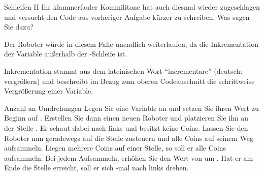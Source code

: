 \documentclass{../tuda-exercise}
\begin{document}
  \begin{task}[credit=\stars{1}{3}]{Schleifen II}
    Ihr klammerfauler Kommilitone hat auch diesmal wieder zugeschlagen und versucht den Code aus
    vorheriger Aufgabe kürzer zu schreiben. Was sagen Sie dazu?

    

    \begin{solution}
      Der Roboter würde in diesem Falle unendlich weiterlaufen, da die Inkrementation der
      Variable  außerhalb der -Schleife ist.

      \begin{note}[title=Information:]
        Inkrementation stammt aus dem lateinischen Wort \enquote{incrementare} (deutsch:
        vergrößern) und beschreibt im Bezug zum oberen Codeauschnitt die schrittweise
        Vergrößerung einer Variable.
      \end{note}
    \end{solution}
  \end{task}

  \begin{task}[credit=\stars{2}{3}]{Anzahl an Umdrehungen}
    Legen Sie eine Variable  an und setzen Sie ihren Wert zu Beginn
    auf . Erstellen Sie dann einen neuen Roboter und platzieren Sie ihn an der
    Stelle . Er schaut dabei nach links und besitzt keine Coins. Lassen Sie den
    Roboter nun geradewegs auf die Stelle  zusteuern und alle Coins auf seinem
    Weg aufsammeln. Liegen mehrere Coins auf einer Stelle, so soll er alle Coins aufsammeln. Bei
    jedem Aufsammeln, erhöhen Sie den Wert von  um . Hat
    er am Ende die Stelle  erreicht, soll er sich
    -mal nach links drehen.

    \begin{solution}
      
    \end{solution}
  \end{task}
\end{document}
